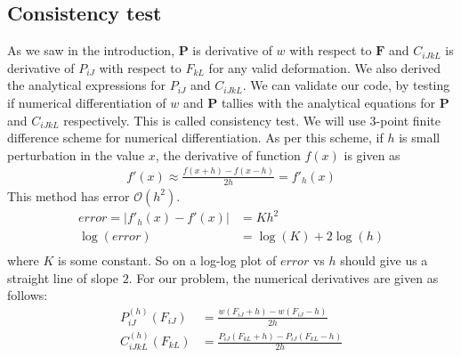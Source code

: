 \message{ !name(p2.tex)}\documentclass[../main.tex]{subfiles}
\begin{document}
\subsection{Consistency test}
\label{sec:consistency}
As we saw in the introduction, $\mathbf{P}$ is derivative of $w$ with
respect to $\mathbf{F}$ and $C_{iJkL}$ is derivative of $P_{iJ}$ with
respect to $F_{kL}$ for any valid deformation. We also derived the
analytical expressions for $P_{iJ}$ and $C_{iJkL}$. We can validate
our code, by testing if numerical differentiation of $w$ and
$\mathbf{P}$ tallies with the analytical equations for $\mathbf{P}$
and $C_{iJkL}$ respectively. This is called consistency test.  We will
use 3-point finite difference scheme for numerical differentiation. As
per this scheme, if $h$ is small perturbation in the value $x$, the
derivative of function $f(x)$ is given as
\begin{align*}
  f'(x) \approx \frac{f(x+h)-f(x-h)}{2h} = f'_h(x)
\end{align*}
This method has error $\mathcal{O}(h^2)$.
\begin{align*}
  error = |f'_h(x) - f'(x)| &= Kh^2\\
  \log(error) &= \log(K) + 2\log(h)\\
\end{align*}
where $K$ is some constant. So on a log-log plot of $error$ vs $h$
should give us a straight line of slope $2$.  For our problem, the
numerical derivatives are given as follows:
\begin{align*}
  P^{(h)}_{iJ}(F_{iJ}) &= \frac{w(F_{iJ}+h) - w(F_{iJ}-h)}{2h}\\
  C^{(h)}_{iJkL}(F_{kL})&=\frac{P_{iJ}(F_{kL}+h) - P_{iJ}(F_{kL}-h)}{2h}\\
\end{align*}
\end{document}
